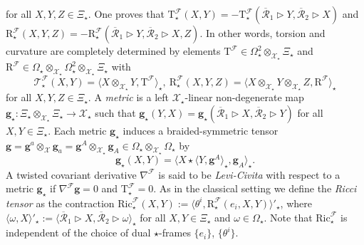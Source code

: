 \documentclass[a4paper,11pt]{article}
\begin{document}
for all $X,Y,Z\in\Xi_\star$. One proves that
$\mathrm{T}^\mathcal{F}_\star(X,Y)=-\mathrm{T}^\mathcal{F}_\star(\overline{\mathcal{R}}_1\rhd Y,\overline{\mathcal{R}}_2\rhd X)$ and
$\mathrm{R}^\mathcal{F}_\star(X,Y,Z)=-\mathrm{R}^\mathcal{F}_\star(\overline{\mathcal{R}}_1\rhd Y,\overline{\mathcal{R}}_2\rhd X,Z)$. In other words, torsion and curvature are
completely determined by elements
$\mathrm{T}^\mathcal{F}\in\Omega^2_\star\otimes_{\mathcal{X}_\star}\Xi_\star$
and 
$\mathrm{R}^\mathcal{F}\in\Omega_\star\otimes_{\mathcal{X}_\star}\Omega^2_\star
\otimes_{\mathcal{X}_\star}\Xi_\star$ with
\begin{equation}
    \mathcal{T}^\mathcal{F}_\star(X,Y)=\langle
    X\otimes_{\mathcal{X}_\star}Y,\mathrm{T}^\mathcal{F}\rangle_\star,~
    \mathrm{R}^\mathcal{F}_\star(X,Y,Z)=\langle
    X\otimes_{\mathcal{X}_\star}Y\otimes_{\mathcal{X}_\star}Z,
    \mathrm{R}^\mathcal{F}\rangle_\star
\end{equation}
for all $X,Y,Z\in\Xi_\star$. A \textit{metric} is a left $\mathcal{X}_\star$-linear
non-degenerate map
$\mathbf{g}_\star\colon\Xi_\star\otimes_{\mathcal{X}_\star}\Xi_\star
\rightarrow\mathcal{X}_\star$ such that $\mathbf{g}_\star(Y,X)=
\mathbf{g}_\star(\overline{\mathcal{R}}_1\rhd X,\overline{\mathcal{R}}_2\rhd Y)$
for all $X,Y\in\Xi_\star$. Each metric $\mathbf{g}_\star$
induces a braided-symmetric tensor
$\mathbf{g}=\mathbf{g}^a\otimes_\mathcal{X}\mathbf{g}_a
=\mathbf{g}^A\otimes_{\mathcal{X}_\star}\mathbf{g}_A
\in\Omega_\star\otimes_{\mathcal{X}_\star}\Omega_\star$ by
\begin{equation} \label{Defgstar}
    \mathbf{g}_\star(X,Y)=\langle X\star\langle Y,
    \mathbf{g}^A\rangle_\star,\mathbf{g}_A\rangle_\star.
\end{equation}
A twisted covariant derivative $\nabla^\mathcal{F}$ is said to be
\textit{Levi-Civita} with respect to a metric $\mathbf{g}_\star$ if 
$\nabla^\mathcal{F}\mathbf{g}=0$ and $\mathrm{T}^\mathcal{F}_\star=0$.
As in the classical setting we define the 
\textit{Ricci tensor} as the contraction
$\mathrm{Ric}^\mathcal{F}_\star(X,Y):=\langle \theta^i,\mathrm{R}^\mathcal{F}_\star(e_i,X,Y)\rangle'_\star$, where
$\langle\omega,X\rangle'_\star:=\langle\overline{\mathcal{R}}_1\rhd X,
\overline{\mathcal{R}}_2\rhd\omega\rangle_\star$ for all $X,Y\in\Xi_\star$ and
$\omega\in\Omega_\star$. Note that $\mathrm{Ric}^\mathcal{F}_\star$ is independent of
the choice of dual $\star$-frames $\{e_i\}$, $\{\theta^i\}$.
\end{document}
